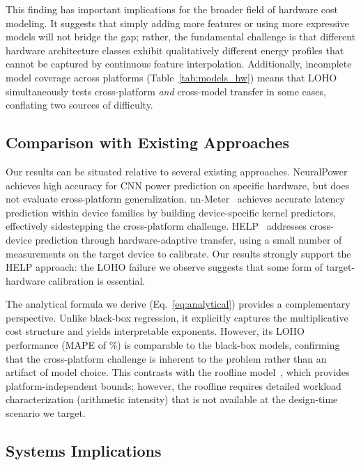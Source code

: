 \documentclass{ieeeaccess}
\begin{document}
This finding has important implications for the broader field of hardware cost modeling.
It suggests that simply adding more features or using more expressive models will not bridge the gap; rather, the fundamental challenge is that different hardware architecture classes exhibit qualitatively different energy profiles that cannot be captured by continuous feature interpolation.
Additionally, incomplete model coverage across platforms (Table~\ref{tab:models_hw}) means that LOHO simultaneously tests cross-platform \emph{and} cross-model transfer in some cases, conflating two sources of difficulty.

\subsection{Comparison with Existing Approaches}
\label{sec:discussion_comparison}

Our results can be situated relative to several existing approaches.
NeuralPower~\cite{cai2017neuralpower} achieves high accuracy for CNN power prediction on specific hardware, but does not evaluate cross-platform generalization.
nn-Meter~\cite{zhang2021nnmeter} achieves accurate latency prediction within device families by building device-specific kernel predictors, effectively sidestepping the cross-platform challenge.
HELP~\cite{lee2021help} addresses cross-device prediction through hardware-adaptive transfer, using a small number of measurements on the target device to calibrate.
Our results strongly support the HELP approach: the LOHO failure we observe suggests that some form of target-hardware calibration is essential.

The analytical formula we derive (Eq.~\ref{eq:analytical}) provides a complementary perspective.
Unlike black-box regression, it explicitly captures the multiplicative cost structure and yields interpretable exponents.
However, its LOHO performance (MAPE of \unskip\%) is comparable to the black-box models, confirming that the cross-platform challenge is inherent to the problem rather than an artifact of model choice.
This contrasts with the roofline model~\cite{williams2009roofline}, which provides platform-independent bounds; however, the roofline requires detailed workload characterization (arithmetic intensity) that is not available at the design-time scenario we target.

\subsection{Systems Implications}
\label{sec:discussion_systems}
\end{document}
